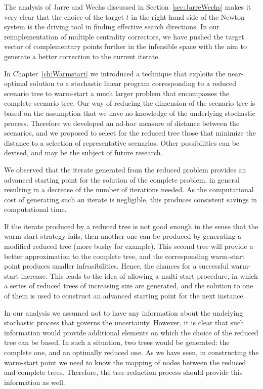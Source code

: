 The analysis of Jarre and Wechs discussed in Section~\ref{sec:JarreWechs}
makes it very clear that the choice of the target $t$ in
the right-hand side of the Newton system is the driving
tool in finding effective search directions.
In our reimplementation of multiple centrality correctors, we
have pushed the target vector of complementary points further
in the infeasible space with the aim to generate a better
correction to the current iterate.

In Chapter~\ref{ch:Warmstart}
we introduced a technique that exploits the near-optimal solution
to a stochastic linear program corresponding to a 
reduced scenario tree to warm-start a much larger problem 
that encompasses the complete scenario tree.
Our way of reducing the dimension of the scenario tree 
is based on the assumption that we have no knowledge 
of the underlying stochastic process. 
Therefore we developed an ad-hoc measure of distance 
between the scenarios, and we proposed to select for the 
reduced tree those that minimize the distance to 
a selection of representative scenarios. 
Other possibilities can be devised, and may be 
the subject of future research.

We observed that the iterate generated from the reduced problem
provides an advanced starting point for the solution of the complete problem,
in general resulting in a decrease of the number of iterations needed.
As the computational cost of generating such an iterate is negligible,
this produces consistent savings in computational time.

If the iterate produced by a reduced tree is not good enough 
in the sense that the warm-start strategy fails, then another one 
can be produced by generating a modified reduced tree (more 
bushy for example).
This second tree will provide a better approximation to the
complete tree, and the corresponding warm-start point produces
smaller infeasibilities. Hence, the chances for a successful 
warm-start increase.
This leads to the idea of allowing a multi-start procedure, in
which a series of reduced trees of increasing size are generated,
and the solution to one of them is used to construct an 
advanced starting point for the next instance.

In our analysis we assumed not to have any information about the
undelying stochastic process that governs the uncertainty.
However, it is clear that such information would provide additional
elements on which the choice of the reduced tree can be based.
In such a situation, two trees would be generated: the complete one,
and an optimally reduced one.
As we have seen, in constructing the warm-start point we need
to know the mapping of nodes between the reduced and complete trees.
Therefore, the tree-reduction process should provide this information
as well.

